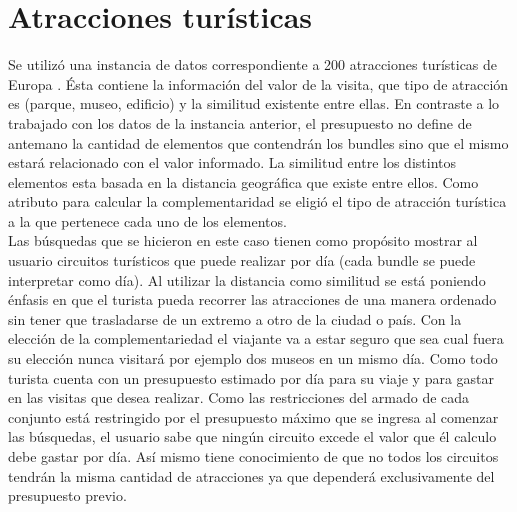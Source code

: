 \section{Atracciones turísticas}
Se utilizó una instancia de datos correspondiente a 200 atracciones turísticas de Europa \cite{turisticAtraction}. Ésta contiene la información del valor de la visita, que tipo de atracción es (parque, museo, edificio) y la similitud existente entre ellas. En contraste a lo trabajado con los datos de la instancia anterior, el presupuesto no define de antemano la cantidad de elementos que contendrán los bundles sino que el mismo estará relacionado con el valor informado. La similitud entre los distintos elementos esta basada en la distancia geográfica que existe entre ellos. Como atributo para calcular la complementaridad se eligió el tipo de atracción turística a la que pertenece cada uno de los elementos.\\

Las búsquedas que se hicieron en este caso tienen como propósito mostrar al usuario circuitos turísticos que puede realizar por día (cada bundle se puede interpretar como día). Al utilizar la distancia como similitud se está poniendo énfasis en que el turista pueda recorrer las atracciones de una manera ordenado sin tener que trasladarse de un extremo a otro de la ciudad o país. Con la elección de la complementariedad el viajante va a estar seguro que sea cual fuera su elección nunca visitará por ejemplo dos museos en un mismo día. Como todo turista cuenta con un presupuesto estimado por día para su viaje y para gastar en las visitas que desea realizar. Como las restricciones del armado de cada conjunto está restringido por el presupuesto máximo que se ingresa al comenzar las búsquedas, el usuario sabe que ningún circuito excede el valor que él calculo debe gastar por día. Así mismo tiene conocimiento de que no todos los circuitos tendrán la misma cantidad de atracciones ya que dependerá exclusivamente del presupuesto previo.
